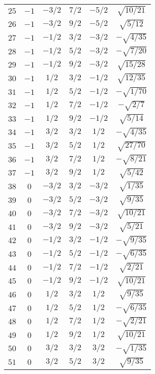 \begin{table}
\begin{center}
\begin{tabular}{|c|c|c|c|c|c|}
$25$ & $-1$ & $-3/2$ & $7/2$ & $-5/2$ & $\sqrt{10/21}$ \\ 
$26$ & $-1$ & $-3/2$ & $9/2$ & $-5/2$ & $\sqrt{5/12}$ \\ 
$27$ & $-1$ & $-1/2$ & $3/2$ & $-3/2$ & $-\sqrt{4/35}$ \\ 
$28$ & $-1$ & $-1/2$ & $5/2$ & $-3/2$ & $-\sqrt{7/20}$ \\ 
$29$ & $-1$ & $-1/2$ & $9/2$ & $-3/2$ & $\sqrt{15/28}$ \\ 
$30$ & $-1$ & $1/2$ & $3/2$ & $-1/2$ & $\sqrt{12/35}$ \\ 
$31$ & $-1$ & $1/2$ & $5/2$ & $-1/2$ & $-\sqrt{1/70}$ \\ 
$32$ & $-1$ & $1/2$ & $7/2$ & $-1/2$ & $-\sqrt{2/7}$ \\ 
$33$ & $-1$ & $1/2$ & $9/2$ & $-1/2$ & $\sqrt{5/14}$ \\ 
$34$ & $-1$ & $3/2$ & $3/2$ & $1/2$ & $-\sqrt{4/35}$ \\ 
$35$ & $-1$ & $3/2$ & $5/2$ & $1/2$ & $\sqrt{27/70}$ \\ 
$36$ & $-1$ & $3/2$ & $7/2$ & $1/2$ & $-\sqrt{8/21}$ \\ 
$37$ & $-1$ & $3/2$ & $9/2$ & $1/2$ & $\sqrt{5/42}$ \\ 
$38$ & $0$ & $-3/2$ & $3/2$ & $-3/2$ & $\sqrt{1/35}$ \\ 
$39$ & $0$ & $-3/2$ & $5/2$ & $-3/2$ & $\sqrt{9/35}$ \\ 
$40$ & $0$ & $-3/2$ & $7/2$ & $-3/2$ & $\sqrt{10/21}$ \\ 
$41$ & $0$ & $-3/2$ & $9/2$ & $-3/2$ & $\sqrt{5/21}$ \\ 
$42$ & $0$ & $-1/2$ & $3/2$ & $-1/2$ & $-\sqrt{9/35}$ \\ 
$43$ & $0$ & $-1/2$ & $5/2$ & $-1/2$ & $-\sqrt{6/35}$ \\ 
$44$ & $0$ & $-1/2$ & $7/2$ & $-1/2$ & $\sqrt{2/21}$ \\ 
$45$ & $0$ & $-1/2$ & $9/2$ & $-1/2$ & $\sqrt{10/21}$ \\ 
$46$ & $0$ & $1/2$ & $3/2$ & $1/2$ & $\sqrt{9/35}$ \\ 
$47$ & $0$ & $1/2$ & $5/2$ & $1/2$ & $-\sqrt{6/35}$ \\ 
$48$ & $0$ & $1/2$ & $7/2$ & $1/2$ & $-\sqrt{2/21}$ \\ 
$49$ & $0$ & $1/2$ & $9/2$ & $1/2$ & $\sqrt{10/21}$ \\ 
$50$ & $0$ & $3/2$ & $3/2$ & $3/2$ & $-\sqrt{1/35}$ \\ 
$51$ & $0$ & $3/2$ & $5/2$ & $3/2$ & $\sqrt{9/35}$ \\ 

\end{tabular}
\end{center}
\end{table}
